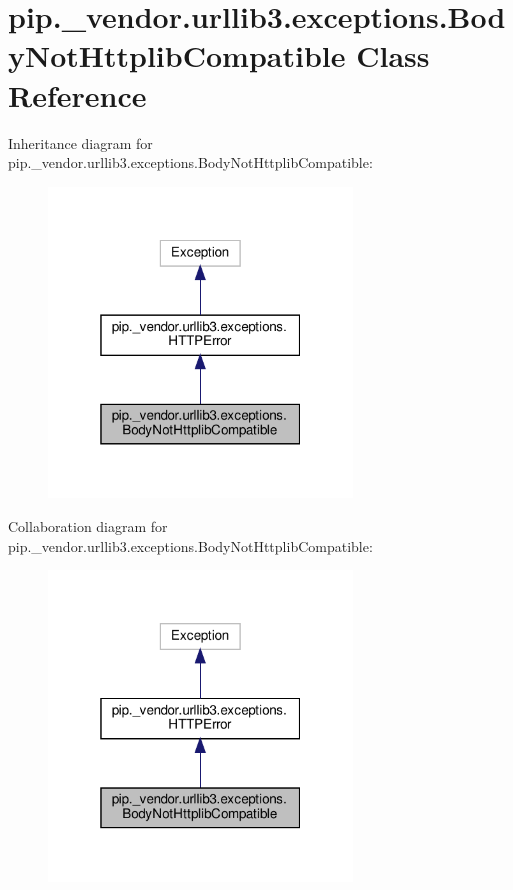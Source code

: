 \hypertarget{classpip_1_1__vendor_1_1urllib3_1_1exceptions_1_1BodyNotHttplibCompatible}{}\section{pip.\+\_\+vendor.\+urllib3.\+exceptions.\+Body\+Not\+Httplib\+Compatible Class Reference}
\label{classpip_1_1__vendor_1_1urllib3_1_1exceptions_1_1BodyNotHttplibCompatible}


Inheritance diagram for pip.\+\_\+vendor.\+urllib3.\+exceptions.\+Body\+Not\+Httplib\+Compatible\+:
\nopagebreak
\begin{figure}[H]
\begin{center}
\leavevmode
\includegraphics[width=229pt]{classpip_1_1__vendor_1_1urllib3_1_1exceptions_1_1BodyNotHttplibCompatible__inherit__graph}
\end{center}
\end{figure}


Collaboration diagram for pip.\+\_\+vendor.\+urllib3.\+exceptions.\+Body\+Not\+Httplib\+Compatible\+:
\nopagebreak
\begin{figure}[H]
\begin{center}
\leavevmode
\includegraphics[width=229pt]{classpip_1_1__vendor_1_1urllib3_1_1exceptions_1_1BodyNotHttplibCompatible__coll__graph}
\end{center}
\end{figure}


